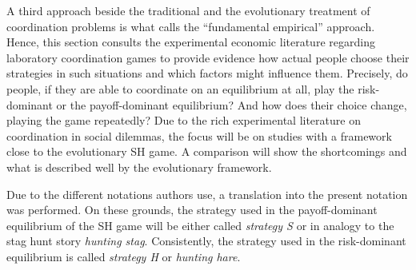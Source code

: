 \label{sec:experimentalevidence}
A third approach beside the traditional and the evolutionary treatment of 
coordination problems is what \textcite{camerer_behavioral_2003} calls the 
``fundamental empirical'' approach.
Hence, this section consults the experimental economic literature regarding 
laboratory coordination games to provide evidence how actual people choose
their strategies in such situations and which factors might influence them. 
Precisely, do people, if they are able to coordinate on an equilibrium at all,
play the risk-dominant or the payoff-dominant equilibrium? And how does their
choice change, playing the game repeatedly?
Due to the rich experimental literature on coordination in social 
dilemmas, the focus will be on studies with a framework close to the  
evolutionary SH game. A comparison will show the shortcomings and what
is described well by the evolutionary framework.
 
Due to the different notations authors use, a translation into the present
notation was performed.
On these grounds, the 
strategy used in the payoff-dominant equilibrium of the SH game will be 
either called  \textit{strategy S} or in analogy to the stag hunt story 
\textit{hunting stag}.
Consistently, the strategy used in the risk-dominant equilibrium is called
\textit{strategy H} or \textit{hunting hare}.

